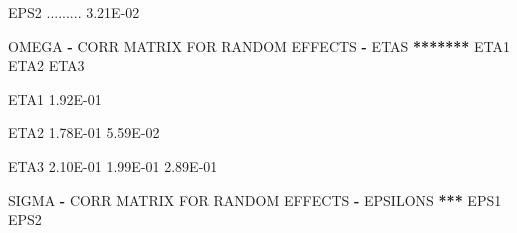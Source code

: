 \documentclass[
  11pt,
  krantz2,
  a4paper]{krantz}
\newenvironment{Shaded}{\begin{snugshade}}{\end{snugshade}}
\newcommand{\ErrorTok}[1]{\textcolor[rgb]{0.64,0.00,0.00}{\textbf{#1}}}
\newcommand{\FloatTok}[1]{\textcolor[rgb]{0.00,0.00,0.81}{#1}}
\newcommand{\NormalTok}[1]{#1}
\newcommand{\OperatorTok}[1]{\textcolor[rgb]{0.81,0.36,0.00}{\textbf{#1}}}
\newcommand{\StringTok}[1]{\textcolor[rgb]{0.31,0.60,0.02}{#1}}
\theoremstyle{definition}
\theoremstyle{definition}
\theoremstyle{definition}
\theoremstyle{remark}
\begin{document}
\begin{Shaded}
\begin{Highlighting}[]
\NormalTok{EPS2   .........  }\FloatTok{3.21E{-}02}                                                                             
                                                                                                       
                                                                                                       
                                                                                                       
                                                                                                       
\NormalTok{OMEGA }\OperatorTok{{-}}\StringTok{ }\NormalTok{CORR MATRIX FOR RANDOM EFFECTS }\OperatorTok{{-}}\StringTok{ }\NormalTok{ETAS  }\OperatorTok{**}\ErrorTok{*****}\StringTok{                                                 }
\StringTok{                                                                                                       }
\StringTok{                                                                                                       }
\StringTok{        }\NormalTok{ETA1      ETA2      ETA3                                                                       }
                                                                                                       
\NormalTok{ETA1    }\FloatTok{1.92E{-}01}                                                                                       
                                                                                                       
\NormalTok{ETA2    }\FloatTok{1.78E{-}01}  \FloatTok{5.59E{-}02}                                                                             
                                                                                                       
\NormalTok{ETA3    }\FloatTok{2.10E{-}01}  \FloatTok{1.99E{-}01}  \FloatTok{2.89E{-}01}                                                                   
                                                                                                       
                                                                                                       
                                                                                                       
\NormalTok{SIGMA }\OperatorTok{{-}}\StringTok{ }\NormalTok{CORR MATRIX FOR RANDOM EFFECTS }\OperatorTok{{-}}\StringTok{ }\NormalTok{EPSILONS  }\OperatorTok{**}\ErrorTok{*}\StringTok{                                                 }
\StringTok{                                                                                                       }
\StringTok{                                                                                                       }
\StringTok{        }\NormalTok{EPS1      EPS2                                                                                 }
                                                                                                       

\end{Highlighting}
\end{Shaded}
\end{document}
